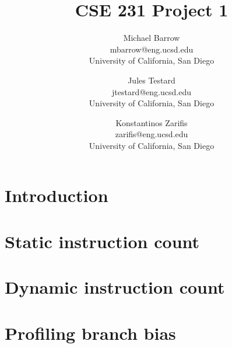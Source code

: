 \documentclass[letterpaper,twocolumn,10pt]{article}
\begin{document}
\date{}

\title{\Large \bf CSE 231 Project 1}

\author{
{\rm Michael Barrow}\\
mbarrow@eng.ucsd.edu\\
University of California, San Diego
\and
{\rm Jules Testard}\\
jtestard@eng.ucsd.edu \\
University of California, San Diego
\and
{Konstantinos Zarifis} \\
zarifis@eng.ucsd.edu \\
University of California, San Diego
}

\maketitle

\thispagestyle{empty}


\section{Introduction}

\section{Static instruction count}

\section{Dynamic instruction count}

\section{Profiling branch bias}

%
\end{document}
